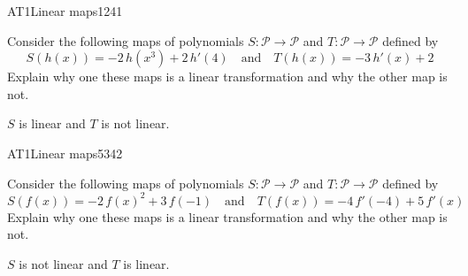 \begin{exercise}{AT1}{Linear maps}{1241} 
\begin{exerciseStatement} 

 Consider the following maps of polynomials \(S:\mathcal{P}\rightarrow\mathcal{P}\) and \(T:\mathcal{P}\rightarrow\mathcal{P}\) defined by \[
            S(h(x))=
                    -2 \, h\left(x^{3}\right) + 2 \, h'\left(4\right)
                \hspace{1em} \text{and} \hspace{1em}
            T(h(x))=
                    -3 \, h'\left(x\right) + 2
        \] Explain why one these maps is a linear transformation and why the other map is not. 

 \end{exerciseStatement}
 \begin{exerciseAnswer} 

\(S\) is linear and \(T\) is not linear.

 \end{exerciseAnswer}
 \end{exercise}


\begin{exercise}{AT1}{Linear maps}{5342} 
\begin{exerciseStatement} 

 Consider the following maps of polynomials \(S:\mathcal{P}\rightarrow\mathcal{P}\) and \(T:\mathcal{P}\rightarrow\mathcal{P}\) defined by \[
            S(f(x))=
                    -2 \, f\left(x\right)^{2} + 3 \, f\left(-1\right)
                \hspace{1em} \text{and} \hspace{1em}
            T(f(x))=
                    -4 \, f'\left(-4\right) + 5 \, f'\left(x\right)
        \] Explain why one these maps is a linear transformation and why the other map is not. 

 \end{exerciseStatement}
 \begin{exerciseAnswer} 

\(S\) is not linear and \(T\) is linear.

 \end{exerciseAnswer}
 \end{exercise}


